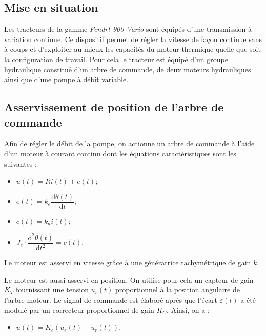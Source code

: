 \documentclass[10pt,fleqn]{article} %
\begin{document}

\vspace{10cm}
\pagestyle{fancy}
\thispagestyle{plain}


\def\columnseprulecolor{\color{ocre}}
\setlength{\columnseprule}{0.4pt} 
\begin{multicols}{2}

\ifprof
\else
\fi
\subsection*{Mise en situation}
\begin{obj} 
\end{obj}
Les tracteurs de la gamme \textit{Fendrt 900 Vario} sont équipés d'une transmission à variation continue. Ce dispositif permet de régler la vitesse de façon continue sans à-coups et d'exploiter au mieux les capacités du moteur thermique quelle que soit la configuration de travail. Pour cela le tracteur est équipé d'un groupe hydraulique constitué d'un arbre de commande, de deux moteurs hydrauliques ainsi que d'une pompe à débit variable.


\subsection*{Asservissement de position de l'arbre de commande}
Afin de régler le débit de la pompe, on actionne un arbre de commande à l'aide d'un moteur à courant continu dont les équations caractéristiques sont les suivantes : 
\begin{itemize}
\item $u(t) = Ri(t)+e(t)$;
\item $e(t)=k_e \dfrac{\text{d}\theta(t)}{\text{d}t}$;
\item $c(t)=k_a i(t)$;
\item $J_e \cdot \dfrac{\text{d}^2\theta(t)}{\text{d}t^2} = c(t)$.
\end{itemize}

Le moteur est asservi en vitesse grâce à une génératrice tachymétrique de gain $k$.

Le moteur est aussi asservi en position. On utilise pour cela  un capteur de gain $K_T$ fournissant une tension $u_r(t)$ proportionnel à la position angulaire de l'arbre moteur. Le signal de commande est élaboré après que l'écart $\varepsilon(t)$ a été modulé par un correcteur proportionnel de gain $K_C$. Ainsi, on a :
\begin{itemize}
\item $u(t)=K_c \left(u_e(t)-u_r(t)\right)$.
\end{itemize}


\end{multicols}
\end{document}
